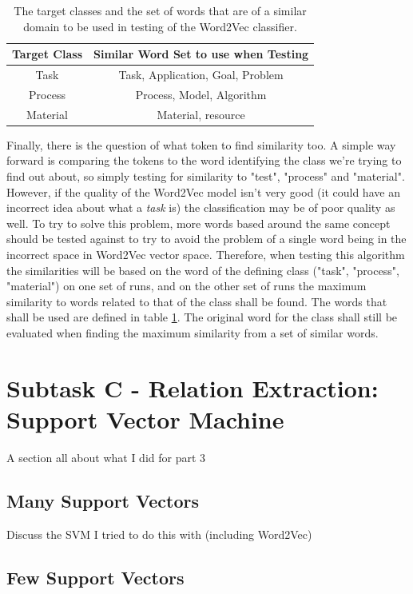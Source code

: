 \begin{table}
	\centering
	\begin{tabular}{ c | c }
		\textbf{Target Class} & \textbf{Similar Word Set to use when Testing} \\
		\hline
		Task & Task, Application, Goal, Problem \\
		 \hline
		Process & Process, Model, Algorithm\\
		 \hline
		Material & Material, resource \\
	\end{tabular}
	\caption[Word2Vec Classification Target Words]{The target classes and the set of words that are of a similar domain to be used in testing of the Word2Vec classifier.}
	\label{table:w2vclasswords}
\end{table}

Finally, there is the question of what token to find similarity too. A simple way forward is comparing the tokens to the word identifying the class we're trying to find out about, so simply testing for similarity to "test", "process" and "material". However, if the quality of the Word2Vec model isn't very good (it could have an incorrect idea about what a \textit{task} is) the classification may be of poor quality as well. To try to solve this problem, more words based around the same concept should be tested against to try to avoid the problem of a single word being in the incorrect space in Word2Vec vector space. Therefore, when testing this algorithm the similarities will be based on the word of the defining class ("task", "process", "material") on one set of runs, and on the other set of runs the maximum similarity to words related to that of the class shall be found. The words that shall be used are defined in table \ref{table:w2vclasswords}. The original word for the class shall still be evaluated when finding the maximum similarity from a set of similar words.

\section{Subtask C - Relation Extraction: Support Vector Machine}
A section all about what I did for part 3
\subsection{Many Support Vectors}
Discuss the SVM I tried to do this with (including Word2Vec)
\subsection{Few Support Vectors}

